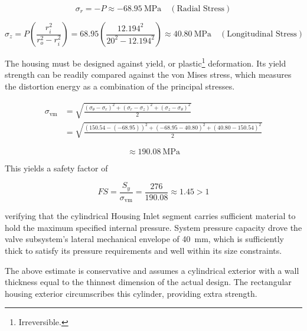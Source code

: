 \documentclass[12pt, letterpaper]{report}%
\newcounter{mycounter}           %
\newcounter{sub}[mycounter]      %
\begin{document}
			\begin{equation}
			\sigma_{r} = -P \approx \SI{-68.95}{\mega\pascal} \quad (\text{Radial Stress})
			\end{equation}

			\begin{equation}
			\sigma_{z} = P \left( \frac{r_i^2}{r_o^2 - r_i^2} \right) = 68.95 \left( \frac{12.194^2}{20^2 - 12.194^2} \right) \approx \SI{40.80}{\mega\pascal} \quad (\text{Longitudinal Stress})
			\end{equation}
			
			The housing must be designed against yield, or plastic\footnote{Irreversible.} deformation.
			Its yield strength can be readily compared against the von Mises stress, which measures the distortion energy as a combination of the principal stresses.

			\begin{equation}
				\begin{aligned}
					\sigma_{\text{vm}} &= \sqrt{\frac{(\sigma_\theta - \sigma_r)^2 + (\sigma_r - \sigma_z)^2 + (\sigma_z - \sigma_\theta)^2}{2}} \\
					&= \sqrt{\frac{(150.54 - (-68.95))^2 + (-68.95 - 40.80)^2 + (40.80 - 150.54)^2}{2}}
				\end{aligned}
			\end{equation}

			\begin{equation}
			\approx \SI{190.08}{\mega\pascal}
			\end{equation}

			This yields a safety factor of

			\begin{equation}
			FS = \frac{S_y}{\sigma_{\text{vm}}} = \frac{276}{190.08} \approx 1.45 > 1
			\end{equation}

			verifying that the cylindrical Housing Inlet segment carries sufficient material to hold the maximum specified internal pressure.
			System pressure capacity drove the valve subsystem's lateral mechanical envelope of \SI{40}{\milli\meter},
			which is sufficiently thick to satisfy its pressure requirements and well within its size constraints.

			The above estimate is conservative and assumes a cylindrical exterior with a wall thickness equal to the thinnest dimension of the actual design.
			The rectangular housing exterior circumscribes this cylinder, providing extra strength.
			
\end{document}
